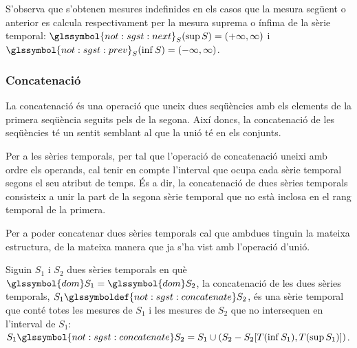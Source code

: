 S'observa que s'obtenen mesures indefinides en els casos que la
mesura següent o anterior es calcula respectivament per la mesura
suprema o ínfima de la sèrie temporal: $\glssymbol{not:sgst:next}_S(\sup
S)=(+\infty,\infty)$ i $\glssymbol{not:sgst:prev}_S(\inf S)=(-\infty,\infty)$.




\subsubsection{Concatenació}

La concatenació és una operació que uneix dues seqüències amb els
elements de la primera seqüència seguits pels de la segona. Així
doncs, la concatenació de les seqüències té un sentit semblant al que
la unió té en els conjunts. 

Per a les sèries temporals, per tal que l'operació de concatenació
uneixi amb ordre els operands, cal tenir en compte l'interval que
ocupa cada sèrie temporal segons el seu atribut de temps.  És a dir,
la concatenació de dues sèries temporals consisteix a unir la part de
la segona sèrie temporal que no està inclosa en el rang temporal de la
primera.

Per a poder concatenar dues sèries temporals cal que ambdues tinguin
la mateixa estructura, de la mateixa manera que ja s'ha vist amb
l'operació d'unió.


\begin{definition}[Concatenació]
  Siguin $S_1$ i $S_2$ dues sèries temporals en què $\glssymbol{dom}
S_1 = \glssymbol{dom} S_2$, la concatenació de les dues sèries
temporals, $S_1 \glssymboldef{not:sgst:concatenate} S_2$, és una sèrie
temporal que conté totes les mesures de $S_1$ i les mesures de $S_2$
que no intersequen en l'interval de $S_1$: $S_1
\glssymbol{not:sgst:concatenate} S_2 = S_1 \cup ( S_2 - S_2[T(\inf
S_1),T(\sup S_1)] )$.
\end{definition}


